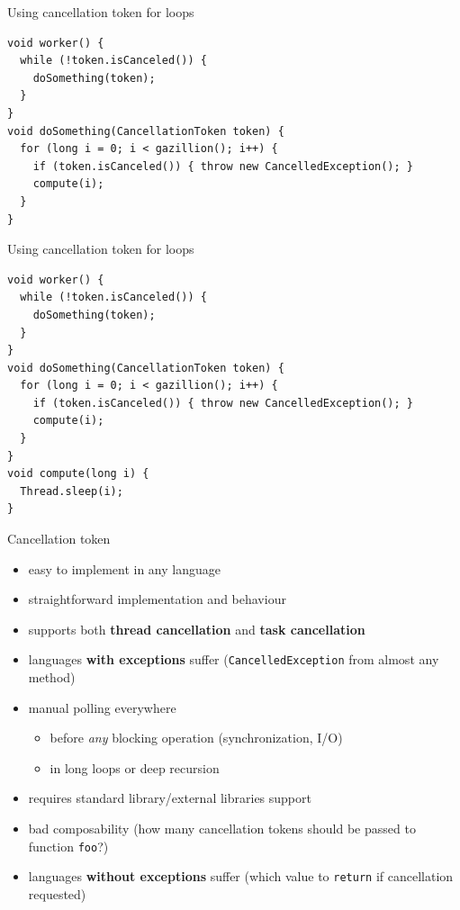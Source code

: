 \begin{frame}{Using cancellation token for loops}
\begin{verbatim}
void worker() {
  while (!token.isCanceled()) { 
    doSomething(token); 
  }
}
void doSomething(CancellationToken token) {
  for (long i = 0; i < gazillion(); i++) { 
    if (token.isCanceled()) { throw new CancelledException(); }
    compute(i);
  }
}
\end{verbatim}
\end{frame}

\begin{frame}{Using cancellation token for loops}
\begin{verbatim}
void worker() {
  while (!token.isCanceled()) { 
    doSomething(token); 
  }
}
void doSomething(CancellationToken token) {
  for (long i = 0; i < gazillion(); i++) { 
    if (token.isCanceled()) { throw new CancelledException(); }
    compute(i);
  }
}
void compute(long i) {
  Thread.sleep(i);
}
\end{verbatim}
\end{frame}

\begin{frame}[fragile]{Cancellation token}
\begin{itemize}
    \item easy to implement in any language
    \item straightforward implementation and behaviour
    \item supports both \textbf{thread cancellation} and \textbf{task cancellation}
    \item languages \textbf{with exceptions} suffer (\texttt{CancelledException} from almost any method)
\end{itemize}

\pause

\begin{itemize}
    \item manual polling everywhere
    \begin{itemize}
        \item before \textit{any} blocking operation (synchronization, I/O)
        \item in long loops or deep recursion
    \end{itemize}        
    \item requires standard library/external libraries support 
    \item bad composability (how many cancellation tokens should be passed to function \texttt{foo}?)
    \item languages \textbf{without exceptions} suffer (which value to \texttt{return} if cancellation requested)
\end{itemize}
\end{frame}

